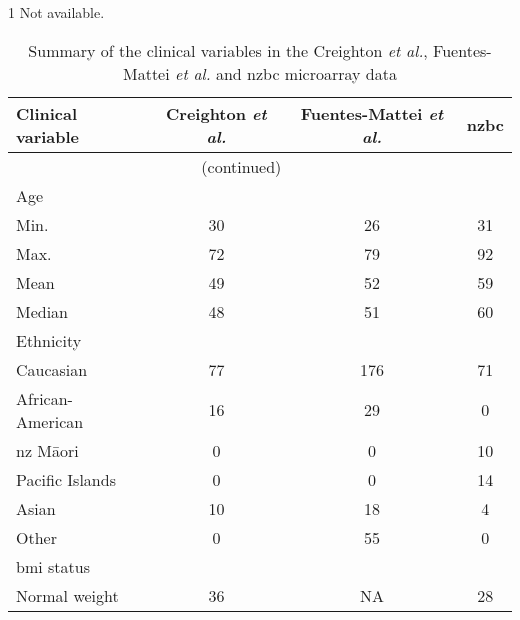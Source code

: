 \begin{ThreePartTable}
		\centering
	\begin{TableNotes}
		\begin{footnotesize}
			\item [1] Not available.
		\end{footnotesize}
	\end{TableNotes}
	
	\newpage
	\begin{longtable}{lccc}
		\caption{Summary of the clinical variables in the Creighton \textit{et al.},  Fuentes-Mattei \textit{et al.} and \gls{nzbc} microarray data}
		\label{tab:clin_summary}\\
		Clinical variable & Creighton \textit{et al.} & Fuentes-Mattei \textit{et al.} & \gls{nzbc} \\
		\hline
		\hline
		\endfirsthead
		\multicolumn{3}{c}{\tablename\ \thetable{}\ (continued)}\\
		\hline
		\hline
		\endhead
		\rule{0pt}{2.25ex}Age \\
		\hspace{1em} Min.                    & 30 & 26 & 31 \\
		\hspace{1em} Max.                    & 72 & 79 & 92 \\
		\hspace{1em} Mean                    & 49 & 52 & 59 \\
		\hspace{1em} Median                  & 48 & 51 & 60 \\
		\hline
		\rule{0pt}{2.25ex}Ethnicity         \\
		\hspace{1em} Caucasian        & 77 & 176 & 71 \\
		\hspace{1em} African-American & 16 & 29  & 0  \\
		\hspace{1em} \gls{nz} M\=aori & 0  & 0   & 10 \\
		\hspace{1em} Pacific Islands  & 0  & 0   & 14 \\
		\hspace{1em} Asian            & 10 & 18  & 4  \\
		\hspace{1em} Other            & 0  & 55  & 0  \\
		\hline
		\rule{0pt}{2.25ex}\gls{bmi} status  \\
		\hspace{1em} Normal weight           & 36 & NA\tnote{1} & 28 \\

\end{longtable}
\end{ThreePartTable}
